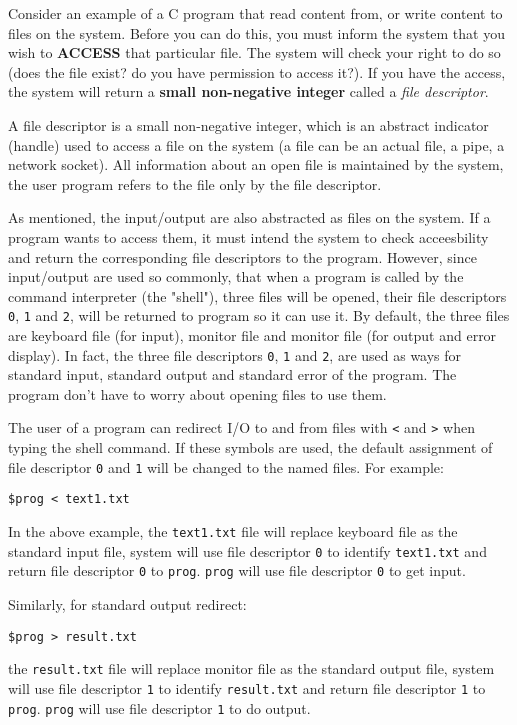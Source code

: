 \documentclass[12pt]{article}
\begin{document}
Consider an example of a C program that read content from, or write content to files on the system. Before you can do this, you must inform the system that you wish to \textbf{ACCESS} that particular file. The system will check your right to do so (does the file exist? do you have permission to access it?). If you have the access, the system will return a \textbf{small non-negative integer} called a \emph{file descriptor}.

A file descriptor is a small non-negative integer, which is an abstract indicator (handle) used to access a file on the system (a file can be an actual file, a pipe, a network socket). All information about an open file is maintained by the system, the user program refers to the file only by the file descriptor.

As mentioned, the input/output are also abstracted as files on the system. If a program wants to access them, it must intend the system to check acceesbility and return the corresponding file descriptors to the program. However, since input/output are used so commonly, that when a program is called by the command interpreter (the "shell"), three files will be opened, their file descriptors \texttt{0}, \texttt{1} and \texttt{2}, will be returned to program so it can use it. By default, the three files are keyboard file (for input), monitor file and monitor file (for output and error display). In fact, the three file descriptors \texttt{0}, \texttt{1} and \texttt{2}, are used as ways for standard input, standard output and standard error of the program. The program don't have to worry about opening files to use them.

The user of a program can redirect I/O to and from files with \texttt{<} and \texttt{>} when typing the shell command. If these symbols are used, the default assignment of file descriptor \texttt{0} and \texttt{1} will be changed to the named files. For example:
\begin{verbatim}
$prog < text1.txt
\end{verbatim}
In the above example, the \texttt{text1.txt} file will replace keyboard file as the standard input file, system will use file descriptor \texttt{0} to identify \texttt{text1.txt} and return file descriptor \texttt{0} to \texttt{prog}. \texttt{prog} will use file descriptor \texttt{0} to get input.

Similarly, for standard output redirect:
\begin{verbatim}
$prog > result.txt
\end{verbatim}
the \texttt{result.txt} file will replace monitor file as the standard output file, system will use file descriptor \texttt{1} to identify \texttt{result.txt} and return file descriptor \texttt{1} to \texttt{prog}. \texttt{prog} will use file descriptor \texttt{1} to do output.
\end{document}
